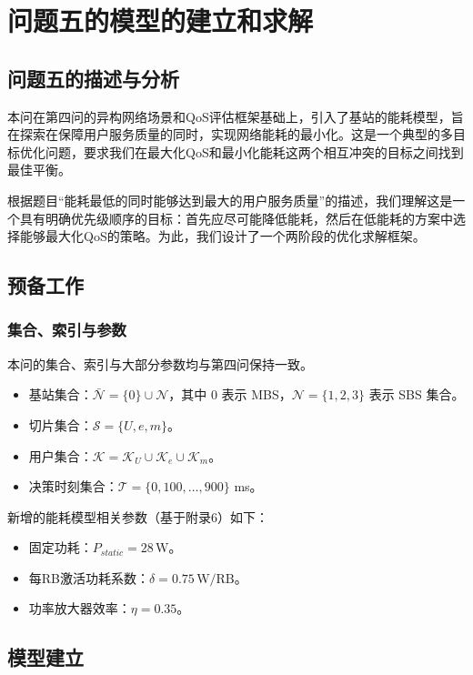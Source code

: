 \section{问题五的模型的建立和求解}
\subsection{问题五的描述与分析}

本问在第四问的异构网络场景和QoS评估框架基础上，引入了基站的能耗模型，旨在探索在保障用户服务质量的同时，实现网络能耗的最小化。这是一个典型的多目标优化问题，要求我们在最大化QoS和最小化能耗这两个相互冲突的目标之间找到最佳平衡。

根据题目“能耗最低的同时能够达到最大的用户服务质量”的描述，我们理解这是一个具有明确优先级顺序的目标：首先应尽可能降低能耗，然后在低能耗的方案中选择能够最大化QoS的策略。为此，我们设计了一个两阶段的优化求解框架。

\subsection{预备工作}

\subsubsection{集合、索引与参数}

本问的集合、索引与大部分参数均与第四问保持一致。
\begin{itemize}
    \item 基站集合：$\bar{\mathcal{N}}=\{0\}\cup\mathcal{N}$，其中 $0$ 表示 MBS，$\mathcal{N}=\{1,2,3\}$ 表示 SBS 集合。
    \item 切片集合：$\mathcal{S}=\{U,e,m\}$。
    \item 用户集合：$\mathcal{K}=\mathcal{K}_U\cup\mathcal{K}_e\cup\mathcal{K}_m$。
    \item 决策时刻集合：$\mathcal{T}=\{0,100,\dots,900\}$ ms。
\end{itemize}

新增的能耗模型相关参数（基于附录6）如下：
\begin{itemize}
    \item 固定功耗：$P_{static} = 28\,\mathrm{W}$。
    \item 每RB激活功耗系数：$\delta = 0.75\,\mathrm{W/RB}$。
    \item 功率放大器效率：$\eta = 0.35$。
\end{itemize}

\subsection{模型建立}

